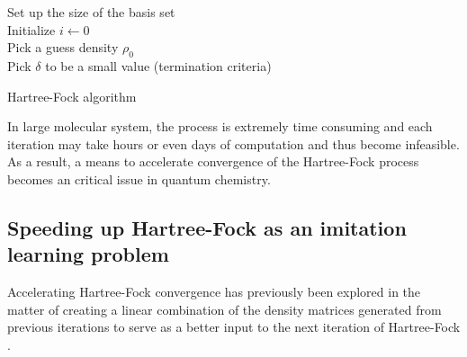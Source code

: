 \documentclass[twoside,11pt]{article}
\begin{document}



\begin{algorithm}[htb]
	Set up the size of the basis set \\
	Initialize $i \leftarrow	 0$ \\	
	Pick a guess density $\rho_0$ \\
	Pick $\delta$ to be a small value (termination criteria) \\
 \caption{Hartree-Fock algorithm}
\label{alg:hf}
\end{algorithm}

In large molecular system, the process is extremely time consuming and each iteration may take hours or even days of computation and thus become infeasible. 
As a result, a means to accelerate convergence of the Hartree-Fock process becomes an critical issue in quantum chemistry.



\subsection{Speeding up Hartree-Fock as an imitation learning problem}


Accelerating Hartree-Fock convergence has previously been explored in the matter of creating a linear combination of the density matrices generated from previous iterations to serve as a better input to the next iteration of Hartree-Fock \citep{Pulay1980}. 
\end{document}
